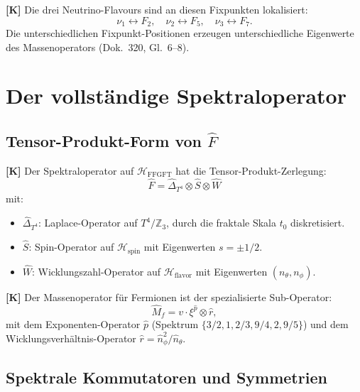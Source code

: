\textbf{[K]} Die drei Neutrino-Flavours sind an diesen Fixpunkten
lokalisiert:
\begin{equation}
  \nu_1 \leftrightarrow F_2,\quad
  \nu_2 \leftrightarrow F_5,\quad
  \nu_3 \leftrightarrow F_7.
  \label{eq:nulok}
\end{equation}
Die unterschiedlichen Fixpunkt-Positionen erzeugen unterschiedliche
Eigenwerte des Massenoperators (Dok.~320, Gl.~6--8).

\section{Der vollständige Spektraloperator}

\subsection{Tensor-Produkt-Form von $\hat{F}$}

\textbf{[K]} Der Spektraloperator auf $\mathcal{H}_{\mathrm{FFGFT}}$
hat die Tensor-Produkt-Zerlegung:
\begin{equation}
  \hat{F} = \hat{\Delta}_{T^4} \otimes \hat{S} \otimes \hat{W}
  \label{eq:Ftensor}
\end{equation}
mit:
\begin{itemize}
  \item $\hat{\Delta}_{T^4}$: Laplace-Operator auf $T^4/\mathbb{Z}_3$,
    durch die fraktale Skala $t_0$ diskretisiert.
  \item $\hat{S}$: Spin-Operator auf $\mathcal{H}_{\mathrm{spin}}$
    mit Eigenwerten $s = \pm 1/2$.
  \item $\hat{W}$: Wicklungszahl-Operator auf
    $\mathcal{H}_{\mathrm{flavor}}$ mit Eigenwerten $(n_\theta,n_\phi)$.
\end{itemize}

\textbf{[K]} Der Massenoperator für Fermionen ist der spezialisierte
Sub-Operator:
\begin{equation}
  \hat{M}_f = v \cdot \xi^{\hat{p}} \otimes \hat{r},
  \label{eq:Mf}
\end{equation}
mit dem Exponenten-Operator $\hat{p}$ (Spektrum
$\{3/2, 1, 2/3, 9/4, 2, 9/5\}$) und dem
Wicklungsverhältnis-Operator $\hat{r} = \hat{n}_\phi^2/\hat{n}_\theta$.

\subsection{Spektrale Kommutatoren und Symmetrien}

